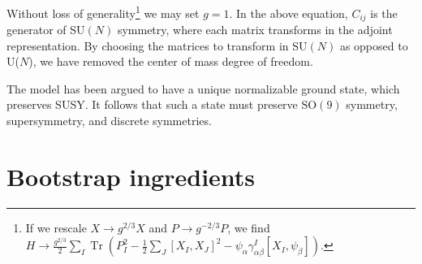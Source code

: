 \documentclass[11pt]{article}
\begin{document}
Without loss of generality\footnote{If we rescale $X \to g^{2/3} X$ and $P \to g^{-2/3} P$, we find
$H \to   \frac{g^{2/3}}{2} \sum_I \operatorname{Tr}\left( P_I^2-\frac{1}{2 }\sum_{J}\left[X_I, X_J\right]^2-\psi_\alpha \gamma_{\alpha \beta}^I\left[X_I, \psi_\beta\right]\right)$.} we may set $g=1$.
In the above equation, $C_{ij}$ is the generator of SU$(N)$ symmetry, where each matrix transforms in the adjoint representation. By choosing the matrices to transform in SU$(N)$ as opposed to U($N$), we have removed the center of mass degree of freedom.






 













The model has been argued \cite{Yi:1997eg, Moore:1998et, Konechny:1998vc, Porrati:1997ej, Sethi:2000zf} to have a unique normalizable ground state, which preserves SUSY. It follows that such a state must preserve $\text{SO}(9)$ symmetry, supersymmetry, and discrete symmetries.

\section{Bootstrap ingredients}
\end{document}
